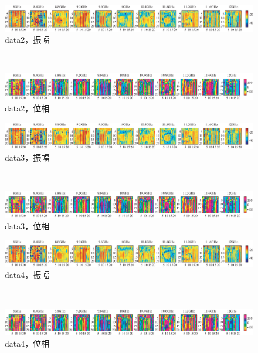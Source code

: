 ﻿\documentclass[12pt,oneside]{jsbook}
\begin{document}
\begin{figure}[bhtp]
 \begin{center}
     \begin{minipage}[c]{\hsize}
\includegraphics[width = \hsize ]{20170205_mine2_a.eps}
\centering\textmd{data2，振幅}
  \end{minipage}
\\
     \begin{minipage}[c]{\hsize}
\includegraphics[width = \hsize ]{20170205_mine2_p.eps}
\centering\textmd{data2，位相}
  \end{minipage}
\end{center}
\end{figure}
\begin{figure}[bhtp]
 \begin{center}
     \begin{minipage}[c]{\hsize}
\includegraphics[width = \hsize ]{20170205_mine3_a.eps}
\centering\textmd{data3，振幅}
  \end{minipage}
\\
     \begin{minipage}[c]{\hsize}
\includegraphics[width = \hsize ]{20170205_mine3_p.eps}
\centering\textmd{data3，位相}
  \end{minipage}
\end{center}
\end{figure}
\begin{figure}[bhtp]
 \begin{center}
     \begin{minipage}[c]{\hsize}
\includegraphics[width = \hsize ]{20170205_mine4_a.eps}
\centering\textmd{data4，振幅}
  \end{minipage}
\\
     \begin{minipage}[c]{\hsize}
\includegraphics[width = \hsize ]{20170205_mine4_p.eps}
\centering\textmd{data4，位相}
  \end{minipage}
\end{center}
\end{figure}
\end{document}
